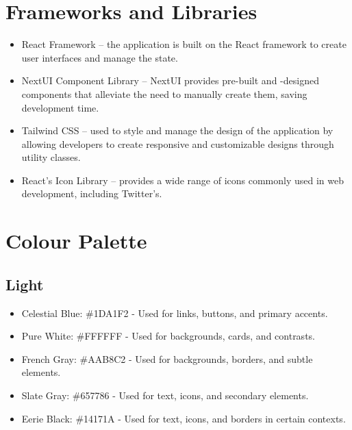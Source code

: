 \documentclass{article}
\begin{document}
\section{Frameworks and Libraries}
\begin{itemize}
    \item React Framework – the application is built on the React framework to create user interfaces and manage the state.
    \item NextUI Component Library – NextUI provides pre-built and -designed components that alleviate the need to manually create them, saving development time.
    \item Tailwind CSS – used to style and manage the design of the application by allowing developers to create responsive and customizable designs through utility classes.
    \item React’s Icon Library – provides a wide range of icons commonly used in web development, including Twitter’s.
\end{itemize}

\section{Colour Palette}
\subsection{Light}
\begin{itemize}
    \item Celestial Blue: \#1DA1F2 - Used for links, buttons, and primary accents.
    \item Pure White: \#FFFFFF - Used for backgrounds, cards, and contrasts.
    \item French Gray: \#AAB8C2 - Used for backgrounds, borders, and subtle elements.
    \item Slate Gray: \#657786 - Used for text, icons, and secondary elements.
    \item Eerie Black: \#14171A - Used for text, icons, and borders in certain contexts.
\end{itemize}
\end{document}
